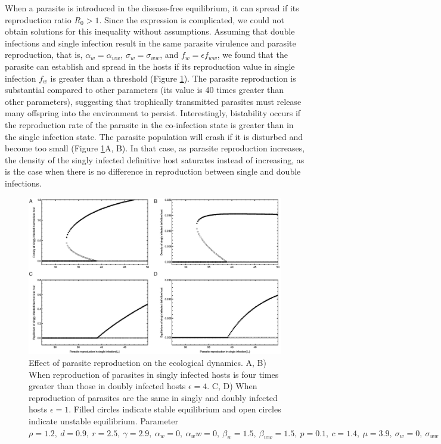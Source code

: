 \documentclass[11pt]{article}
\begin{document}
When a parasite is introduced in the disease-free equilibrium, it can spread if its reproduction ratio $R_0 > 1$. 
Since the expression is complicated, we could not obtain solutions for this inequality without assumptions. 
Assuming that double infections and single infection result in the same parasite virulence and parasite reproduction, that is, $\alpha_w = \alpha_{ww}$, $\sigma_w = \sigma_{ww}$, and $f_w = \epsilon f_{ww}$, we found that the parasite can establish and spread in the hosts if its reproduction value in single infection $f_w$ is greater than a threshold (Figure \ref{fig:bistability}). 
The parasite reproduction is substantial compared to other parameters (its value is 40 times greater than other parameters), suggesting that trophically transmitted parasites must release many offspring into the environment to persist. 
Interestingly, bistability occurs if the reproduction rate of the parasite in the co-infection state is greater than in the single infection state. 
The parasite population will crash if it is disturbed and become too small (Figure \ref{fig:bistability}A, B). 
In that case, as parasite reproduction increases, the density of the singly infected definitive host saturates instead of increasing, as is the case when there is no difference in reproduction between single and double infections.


\begin{figure}[!ht]
\includegraphics[width = \textwidth]{Figures/bistability.jpeg}
\caption{Effect of parasite reproduction on the ecological dynamics. A, B) When reproduction of parasites in singly infected hosts is four times greater than those in doubly infected hosts $\epsilon = 4$. C, D) When reproduction of parasites are the same in singly and doubly infected hosts $\epsilon = 1$. Filled circles indicate stable equilibrium and open circles indicate unstable equilibrium. Parameter $\rho = 1.2, \  d = 0.9, \  r = 2.5, \ \gamma = 2.9, \ \alpha_w = 0, \ \alpha_ww =  0, \ \beta_w = 1.5, \ \beta_{ww} = 1.5, \ p = 0.1, \  c = 1.4, \ \mu = 3.9,  \ \sigma_w = 0, \ \sigma_{ww} = 0, \  q = 0.01, \ \delta = 0.9, \ k = 0.26$
}
\label{fig:bistability}
\end{figure}
\end{document}
